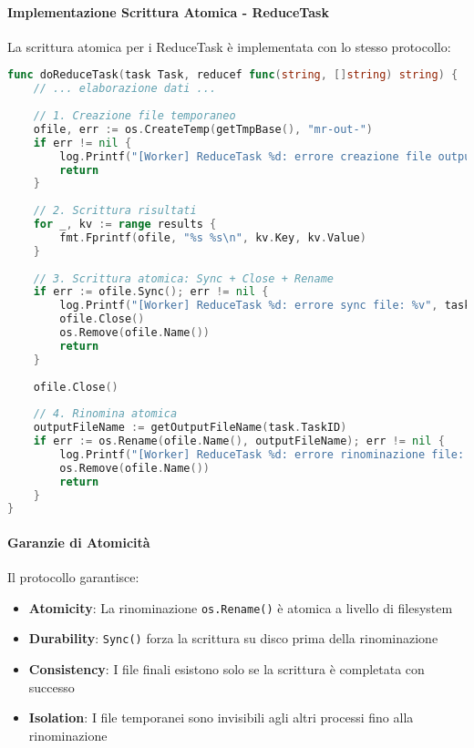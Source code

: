 \documentclass[12pt,a4paper]{article}
\begin{document}
\paragraph{Implementazione Scrittura Atomica - ReduceTask}

La scrittura atomica per i ReduceTask è implementata con lo stesso protocollo:

\begin{lstlisting}[language=Go, caption=Scrittura atomica ReduceTask]
func doReduceTask(task Task, reducef func(string, []string) string) {
    // ... elaborazione dati ...
    
    // 1. Creazione file temporaneo
    ofile, err := os.CreateTemp(getTmpBase(), "mr-out-")
    if err != nil {
        log.Printf("[Worker] ReduceTask %d: errore creazione file output: %v", task.TaskID, err)
        return
    }
    
    // 2. Scrittura risultati
    for _, kv := range results {
        fmt.Fprintf(ofile, "%s %s\n", kv.Key, kv.Value)
    }
    
    // 3. Scrittura atomica: Sync + Close + Rename
    if err := ofile.Sync(); err != nil {
        log.Printf("[Worker] ReduceTask %d: errore sync file: %v", task.TaskID, err)
        ofile.Close()
        os.Remove(ofile.Name())
        return
    }
    
    ofile.Close()
    
    // 4. Rinomina atomica
    outputFileName := getOutputFileName(task.TaskID)
    if err := os.Rename(ofile.Name(), outputFileName); err != nil {
        log.Printf("[Worker] ReduceTask %d: errore rinominazione file: %v", task.TaskID, err)
        os.Remove(ofile.Name())
        return
    }
}
\end{lstlisting}

\paragraph{Garanzie di Atomicità}

Il protocollo garantisce:

\begin{itemize}
\item \textbf{Atomicity}: La rinominazione \texttt{os.Rename()} è atomica a livello di filesystem
\item \textbf{Durability}: \texttt{Sync()} forza la scrittura su disco prima della rinominazione
\item \textbf{Consistency}: I file finali esistono solo se la scrittura è completata con successo
\item \textbf{Isolation}: I file temporanei sono invisibili agli altri processi fino alla rinominazione
\end{itemize}
\end{document}
